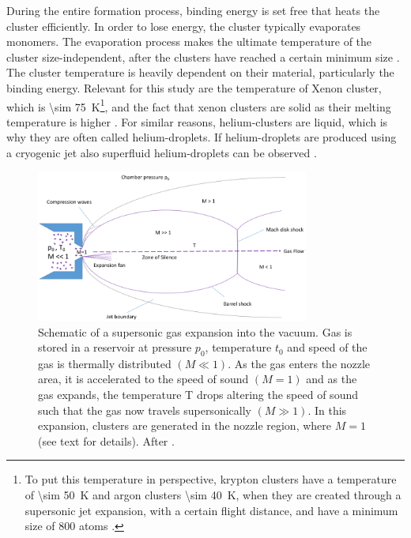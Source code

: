 During the entire formation process, binding energy is set free that heats the cluster efficiently. In order to lose energy, the cluster typically evaporates monomers. The evaporation process makes the ultimate temperature of the cluster size-independent, after the clusters have reached a certain minimum size \citep{Farges-1981-SurfSci}.
The cluster temperature is heavily dependent on their material, particularly the binding energy. Relevant for this study are the temperature of Xenon cluster, which is \SI{\sim 75}{\kelvin}\footnote{To put this temperature in perspective, krypton clusters have a temperature of \SI{\sim 50}{\kelvin} and argon clusters \SI{\sim 40}{\kelvin}, when they are created through a supersonic jet expansion, with a certain flight distance, and have a minimum size of 800 atoms \citep{Farges-1981-SurfSci,Gspann-1986-Springer}.}, and the fact that xenon clusters are solid as their melting temperature is higher \citep{Gspann-1986-Springer}. For similar reasons, helium-clusters are liquid, which is why they are often called helium-droplets. If helium-droplets are produced using a cryogenic jet also superfluid helium-droplets can be observed \citep{Gomez-2011-JCP}.\\[1\baselineskip]
%
\begin{figure}
	\centering
		\includegraphics[width=0.80\textwidth]{images/freeJetExpansion.png}
	\caption[Schematic of a supersonic gas expansion into a vacuum.]{Schematic of a supersonic gas expansion into the vacuum. Gas is stored in a reservoir at pressure $p_{0}$, temperature $t_{0}$ and speed of the gas is thermally distributed $\left(M\ll 1\right)$. As the gas enters the nozzle area, it is accelerated to the speed of sound $\left(M=1\right)$ and as the gas expands, the temperature T drops altering the speed of sound such that the gas now travels supersonically $\left(M\gg 1\right)$. In this expansion, clusters are generated in the nozzle region, where $M=1$ (see text for details). After \citep{Miller-1988-Oxford}.}
	\label{fig:freeJetExpansion}
\end{figure}
